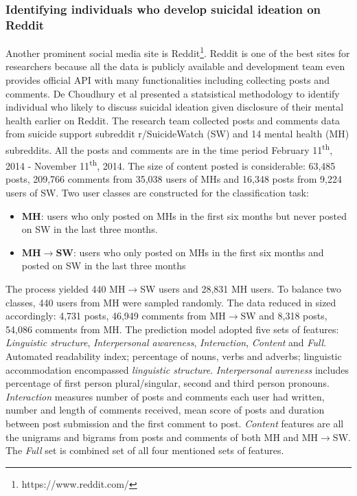 \subsubsection*{Identifying individuals who develop suicidal ideation on Reddit}
Another prominent social media site is Reddit\footnote{https://www.reddit.com/}. Reddit is one of the best sites for researchers because all the data is publicly available and development team even provides official API with many functionalities including collecting posts and comments. De Choudhury et al \cite{DeChoudhury2016} presented a statsistical methodology to identify individual who likely to discuss suicidal ideation given disclosure of their mental health earlier on Reddit. The research team collected posts and comments data from suicide support subreddit r/SuicideWatch (SW) and 14 mental health (MH) subreddits. All the posts and comments are in the time period February 11\textsuperscript{th}, 2014 - November 11\textsuperscript{th}, 2014. The size of content posted is considerable: 63,485 posts, 209,766 comments from 35,038 users of MHs and 16,348 posts from 9,224 users of SW. Two user classes are constructed for the classification task:
\begin{itemize}
\item \textbf{MH}: users who only posted on MHs in the first six months but never posted on SW in the last three months. 
\item \textbf{MH$\rightarrow$SW}: users who only posted on MHs in the first six months and posted on SW in the last three months
\end{itemize}
The process yielded 440 MH$\rightarrow$SW users and 28,831 MH users. To balance two classes, 440 users from MH were sampled randomly. The data reduced in sized accordingly: 4,731 posts, 46,949 comments from MH$\rightarrow$SW and 8,318 posts, 54,086 comments from MH. The prediction model adopted five sets of features: \textit{Linguistic structure}, \textit{Interpersonal awareness}, \textit{Interaction}, \textit{Content} and \textit{Full}. Automated readability index; percentage of nouns, verbs and adverbs; linguistic accommodation encompassed \textit{linguistic structure}. \textit{Interpersonal awreness} includes percentage of first person plural/singular, second and third person pronouns. \textit{Interaction} measures number of posts and comments each user had written, number and length of comments received, mean score of posts and duration between post submission and the first comment to post. \textit{Content} features are all the unigrams and bigrams from posts and comments of both MH and MH$\rightarrow$SW. The \textit{Full} set is combined set of all four mentioned sets of features.\\
